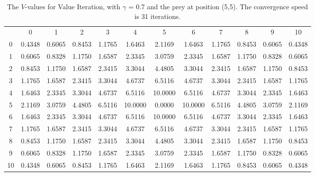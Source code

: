 \documentclass{article}
\begin{document}
\begin{landscape}
\begin{table}[tbp]
\centering
\begin{tabular} {c c c c c c c c c c c c}
 & 0 & 1 & 2 & 3 & 4 & 5 & 6 & 7 & 8 & 9 & 10 \\
0 &  0.4348 &  0.6065 &  0.8453 &  1.1765 &  1.6463 &  2.1169 &  1.6463 &  1.1765 &  0.8453 &  0.6065 &  0.4348\\
1 &  0.6065 &  0.8328 &  1.1750 &  1.6587 &  2.3345 &  3.0759 &  2.3345 &  1.6587 &  1.1750 &  0.8328 &  0.6065\\
2 &  0.8453 &  1.1750 &  1.6587 &  2.3415 &  3.3044 &  4.4805 &  3.3044 &  2.3415 &  1.6587 &  1.1750 &  0.8453\\
3 &  1.1765 &  1.6587 &  2.3415 &  3.3044 &  4.6737 &  6.5116 &  4.6737 &  3.3044 &  2.3415 &  1.6587 &  1.1765\\
4 &  1.6463 &  2.3345 &  3.3044 &  4.6737 &  6.5116 & 10.0000 &  6.5116 &  4.6737 &  3.3044 &  2.3345 &  1.6463\\
5 &  2.1169 &  3.0759 &  4.4805 &  6.5116 & 10.0000 &  0.0000 & 10.0000 &  6.5116 &  4.4805 &  3.0759 &  2.1169\\
6 &  1.6463 &  2.3345 &  3.3044 &  4.6737 &  6.5116 & 10.0000 &  6.5116 &  4.6737 &  3.3044 &  2.3345 &  1.6463\\
7 &  1.1765 &  1.6587 &  2.3415 &  3.3044 &  4.6737 &  6.5116 &  4.6737 &  3.3044 &  2.3415 &  1.6587 &  1.1765\\
8 &  0.8453 &  1.1750 &  1.6587 &  2.3415 &  3.3044 &  4.4805 &  3.3044 &  2.3415 &  1.6587 &  1.1750 &  0.8453\\
9 &  0.6065 &  0.8328 &  1.1750 &  1.6587 &  2.3345 &  3.0759 &  2.3345 &  1.6587 &  1.1750 &  0.8328 &  0.6065\\
10 &  0.4348 &  0.6065 &  0.8453 &  1.1765 &  1.6463 &  2.1169 &  1.6463 &  1.1765 &  0.8453 &  0.6065 &  0.4348\\
\end{tabular}\\
\caption{The $V$-values for Value Iteration, with $\gamma$ = 0.7 and the prey at position (5,5). The convergence speed is 31 iterations.}
\label{valueiteration3}
\end{table}


\end{landscape}
\end{document}
